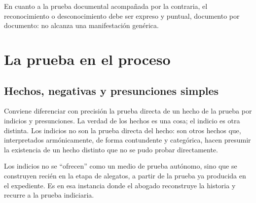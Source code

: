 \documentclass[12pt,oneside]{book}
\begin{document}
En cuanto a la prueba documental acompañada por la contraria, el reconocimiento o desconocimiento debe ser expreso y puntual, documento por documento: no alcanza una manifestación genérica.

\chapter{La prueba en el proceso}

\section{Hechos, negativas y presunciones simples}

Conviene diferenciar con precisión la prueba directa de un hecho de la prueba por indicios y presunciones. La verdad de los hechos es una cosa; el indicio es otra distinta. Los indicios no son la prueba directa del hecho: son otros hechos que, interpretados armónicamente, de forma contundente y categórica, hacen presumir la existencia de un hecho distinto que no se pudo probar directamente.

\begin{note}
Los indicios no se ``ofrecen'' como un medio de prueba autónomo, sino que se construyen recién en la etapa de alegatos, a partir de la prueba ya producida en el expediente. Es en esa instancia donde el abogado reconstruye la historia y recurre a la prueba indiciaria.
\end{note}
\end{document}

